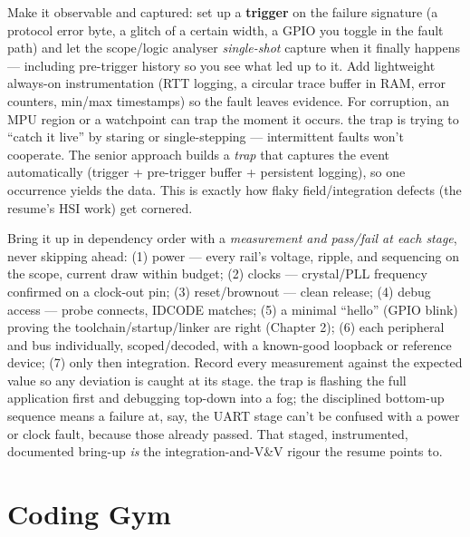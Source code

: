Make it observable and captured: set up a \textbf{trigger} on the failure
signature (a protocol error byte, a glitch of a certain width, a GPIO you toggle
in the fault path) and let the scope/logic analyser \emph{single-shot} capture
when it finally happens --- including pre-trigger history so you see what led up
to it. Add lightweight always-on instrumentation (RTT logging, a circular trace
buffer in RAM, error counters, min/max timestamps) so the fault leaves evidence.
For corruption, an MPU region or a watchpoint can trap the moment it occurs.
\trap the trap is trying to ``catch it live'' by staring or single-stepping ---
intermittent faults won't cooperate. The senior approach builds a \emph{trap}
that captures the event automatically (trigger + pre-trigger buffer + persistent
logging), so one occurrence yields the data. This is exactly how flaky
field/integration defects (the resume's HSI work) get cornered.

Bring it up in dependency order with a \emph{measurement and pass/fail at each
stage}, never skipping ahead: (1) power --- every rail's voltage, ripple, and
sequencing on the scope, current draw within budget; (2) clocks --- crystal/PLL
frequency confirmed on a clock-out pin; (3) reset/brownout --- clean release; (4)
debug access --- probe connects, IDCODE matches; (5) a minimal ``hello'' (GPIO
blink) proving the toolchain/startup/linker are right (Chapter 2); (6) each
peripheral and bus individually, scoped/decoded, with a known-good loopback or
reference device; (7) only then integration. Record every measurement against the
expected value so any deviation is caught at its stage. \trap the trap is flashing
the full application first and debugging top-down into a fog; the disciplined
bottom-up sequence means a failure at, say, the UART stage can't be confused with
a power or clock fault, because those already passed. That staged, instrumented,
documented bring-up \emph{is} the integration-and-V\&V rigour the resume points
to.

\section{Coding Gym}

